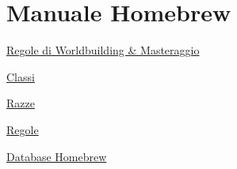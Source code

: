 \section{Manuale Homebrew}\label{manuale-homebrew}

\href{Regole\%20di\%20Worldbuilding\%20&\%20Masteraggio\%20e6ce98138aa6425e83e163794b81a93e.md}{Regole
di Worldbuilding \& Masteraggio}

\href{Classi\%202178e8d906aa4139a8cd9a1f2ef130c6.md}{Classi}

\href{Razze\%20e3c21740a14d451997245d30f2261f26.md}{Razze}

\href{Regole\%20e5c58d36c03746aaa0880f3460d9b271.md}{Regole}

\href{Database\%20Homebrew\%206f9efb35e14d46ac8d1d090dc27aabeb.csv}{Database
Homebrew}
